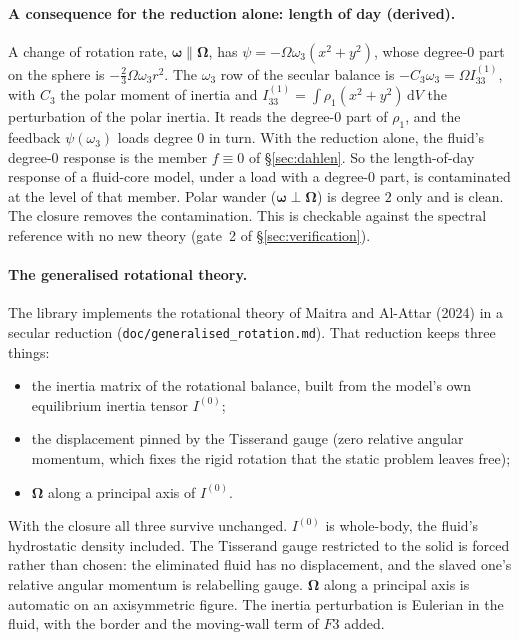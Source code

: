 \documentclass[11pt]{article}
\theoremstyle{definition}
\theoremstyle{remark}
\newcommand{\bOmega}{\boldsymbol{\Omega}}
\newcommand{\bomega}{\boldsymbol{\omega}}
\newcommand{\dV}{\,\mathrm{d}V}
\newcommand{\code}[1]{\texttt{#1}}
\begin{document}
\paragraph{A consequence for the reduction alone: length of day
(derived).} A change of rotation rate, $\bomega \parallel \bOmega$,
has $\psi = -\Omega\omega_3(x^2 + y^2)$, whose degree-0 part on the
sphere is $-\tfrac23\Omega\omega_3r^2$. The $\omega_3$ row of the
secular balance is $-C_3\omega_3 = \Omega I^{(1)}_{33}$, with $C_3$
the polar moment of inertia and $I^{(1)}_{33} = \int\rho_1(x^2 +
y^2)\dV$ the perturbation of the polar inertia. It reads the degree-0
part of $\rho_1$, and the feedback $\psi(\omega_3)$ loads degree $0$
in turn. With the reduction alone, the fluid's degree-0 response is
the member $f \equiv 0$ of \S\ref{sec:dahlen}. So the length-of-day
response of a fluid-core model, under a load with a degree-0 part, is
contaminated at the level of that member. Polar wander ($\bomega \perp
\bOmega$) is degree $2$ only and is clean. The closure removes the
contamination. This is checkable against the spectral reference with
no new theory (gate~2 of \S\ref{sec:verification}).

\paragraph{The generalised rotational theory.} The library implements
the rotational theory of Maitra and Al-Attar (2024) in a secular
reduction (\code{doc/generalised\_rotation.md}). That reduction keeps
three things:
\begin{itemize}
\item the inertia matrix of the rotational balance, built from the
  model's own equilibrium inertia tensor $I^{(0)}$;
\item the displacement pinned by the Tisserand gauge (zero relative
  angular momentum, which fixes the rigid rotation that the static
  problem leaves free);
\item $\bOmega$ along a principal axis of $I^{(0)}$.
\end{itemize}
With the closure all three survive unchanged. $I^{(0)}$ is whole-body,
the fluid's hydrostatic density included. The Tisserand gauge
restricted to the solid is forced rather than chosen: the eliminated
fluid has no displacement, and the slaved one's relative angular
momentum is relabelling gauge. $\bOmega$ along a principal axis is
automatic on an axisymmetric figure. The inertia perturbation is
Eulerian in the fluid, with the border and the moving-wall term of $F3$ added.
\end{document}
